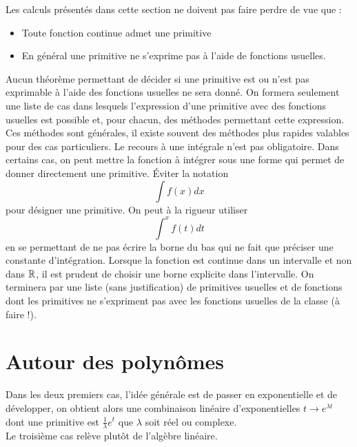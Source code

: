 

Les calculs présentés dans cette section ne doivent pas faire perdre de vue que :
\begin{itemize}
 \item Toute fonction continue admet une primitive
 \item En général une primitive ne s'exprime pas à l'aide de fonctions \og usuelles\fg.
\end{itemize}
Aucun théorème permettant de décider si une primitive est ou n'est pas exprimable à l'aide des fonctions usuelles ne sera donné. On formera seulement une liste de cas dans lesquels l'expression d'une primitive avec des fonctions usuelles est possible et, pour chacun, des méthodes permettant cette expression. Ces méthodes sont générales, il existe souvent des méthodes plus rapides valables pour des cas particuliers.\newline
Le recours à une intégrale n'est pas obligatoire. Dans certains cas, on peut mettre la fonction à intégrer sous une forme qui permet de donner directement une primitive.\newline
\'Eviter la notation
\begin{displaymath}
 \int f(x)dx
\end{displaymath}
pour désigner une primitive. On peut à la rigueur utiliser
\begin{displaymath}
 \int^x f(t)dt
\end{displaymath}
en se permettant de ne pas écrire la borne du bas qui ne fait que préciser une constante d'intégration. Lorsque la fonction est continue dans un intervalle et non dans $\mathbb{R}$, il est prudent de choisir une borne explicite dans l'intervalle.
On terminera par une liste (sans justification) de primitives usuelles et de fonctions dont les primitives ne s'expriment pas avec les fonctions usuelles de la classe (à faire !).

\section{Autour des polynômes}
Dans les deux premiers cas, l'idée générale est de passer en exponentielle et de développer, on obtient alors une combinaison linéaire d'exponentielles $t\rightarrow e^{\lambda t}$ dont une primitive est $\frac{1}{\lambda}e^t$ que $\lambda$ soit réel ou complexe.\\
Le troisième cas relève plutôt de l'algèbre linéaire.
